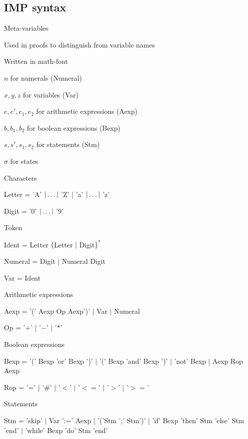 \subsection{IMP syntax}
\enumstart
	\item Meta-variables
	\enumstart
		\item Used in proofs to distinguish from variable names
		\item Written in math-font
		\item $n$ for numerals (Numeral)
		\item $x,y,z$ for variables (Var)
		\item $e, e', e_1, e_2$ for arithmetic expressions (Aexp)
		\item $b, b_1, b_2$ for boolean expressions (Bexp)
		\item $s, s', s_1, s_2$ for statements (Stm)
		\item $\sigma$ for states
	\enumend
	\item Characters
	\enumstart
		\item Letter = 'A' $| \mathellipsis |$ 'Z' $|$ 'a' $| \mathellipsis |$ 'z'
		\item Digit = '0' $| \mathellipsis |$ '9'
	\enumend
	\item Token
	\enumstart
		\item Ident = Letter $\{$Letter $|$ Digit$\}^*$
		\item Numeral = Digit $|$ Numeral Digit
		\item Var = Ident
	\enumend
	\item Arithmetic expressions
	\enumstart
		\item Aexp = '(' Aexp Op Aexp')' $|$ Var $|$ Numeral
		\item Op = '$+$' $|$ '$-$' $|$ '$*$'
	\enumend
	\item Boolean expressions
	\enumstart
		\item Bexp = '(' Bexp 'or' Bexp ')' $|$ '(' Bexp 'and' Bexp ')' $|$ 'not' Bexp $|$ Aexp Rop Aexp
		\item Rop = '=' $|$ '\#' $|$ '$<$' $|$ '$<=$' $|$ '$>$' $|$ '$>=$'
	\enumend
	\item Statements
	\enumstart
		\item Stm = 'skip' $|$ Var ':=' Aexp $|$ '('Stm ';' Stm')' $|$ 'if' Bexp 'then' Stm 'else' Stm 'end' $|$ 'while' Bexp 'do' Stm 'end'
	\enumend
\enumend

